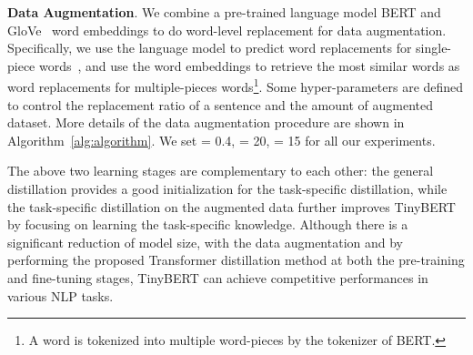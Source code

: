 \documentclass[11pt,a4paper]{article}
\begin{document}
{\bf Data Augmentation}. We combine a pre-trained language model BERT and GloVe~\cite{pennington2014glove} word embeddings to do word-level replacement for data augmentation. Specifically, we use the language model to predict word replacements for single-piece words~\cite{wu2019conditional}, and use the word embeddings to retrieve the most similar words as word replacements for multiple-pieces words\footnote{A word is tokenized into multiple word-pieces by the tokenizer of BERT.}. Some hyper-parameters are defined to control the replacement ratio of a sentence and the amount of augmented dataset. More details of the data augmentation procedure are shown in Algorithm~\ref{alg:algorithm}. We set  = 0.4,  = 20,  = 15 for all our experiments.

The above two learning stages are complementary to each other: the general distillation provides a good initialization for the task-specific distillation, while the task-specific distillation on the augmented data further improves TinyBERT by focusing on learning the task-specific knowledge. Although there is a  significant reduction of model size, with the data augmentation and by performing the proposed Transformer distillation method at both the pre-training and fine-tuning stages, TinyBERT can achieve competitive performances in various NLP tasks.  



 
\end{document}
